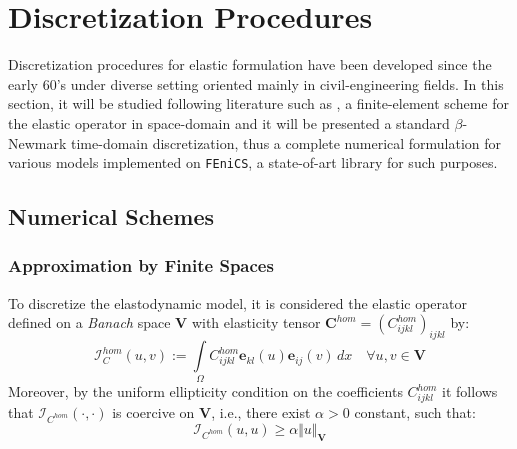 \chapter{Discretization Procedures}

Discretization procedures for elastic formulation have been developed since the early $60$'s under diverse setting oriented mainly in civil-engineering fields. In this section, it will be studied following literature such as \cite{ern2004theory}, \cite{raviart1983introduction} a finite-element scheme for the elastic operator in space-domain and it will be presented a standard $\beta$-Newmark time-domain discretization, thus a complete numerical formulation for various models implemented on \texttt{FEniCS}, a state-of-art library for such purposes.

\section{Numerical Schemes}
\subsection{Approximation by Finite Spaces}
To discretize the elastodynamic model, it is considered the elastic operator defined on a \textit{Banach} space $\mathbf{V}$ with elasticity tensor $\mathbf{C}^{hom} = (C^{hom}_{ijkl})_{ijkl}$ by:
\begin{equation*}
    \mathcal{I}_C^{hom} (u,v) := \int \limits_{\Omega} C^{hom}_{ijkl}\mathbf{e}_{kl}(u) \mathbf{e}_{ij}(v) \, dx \quad \forall u,v \in \mathbf{V}
\end{equation*}
Moreover, by the uniform ellipticity condition on the coefficients $C^{hom}_{ijkl}$ it follows that $\mathcal{I}_{C^{hom}}(\cdot, \cdot)$ is coercive on $\mathbf{V}$, i.e., there exist $\alpha > 0$ constant, such that:
\begin{equation*}
    \mathcal{I}_{C^{hom}} (u,u) \geq  \alpha \Vert u \Vert_{\mathbf{V}}
\end{equation*}

